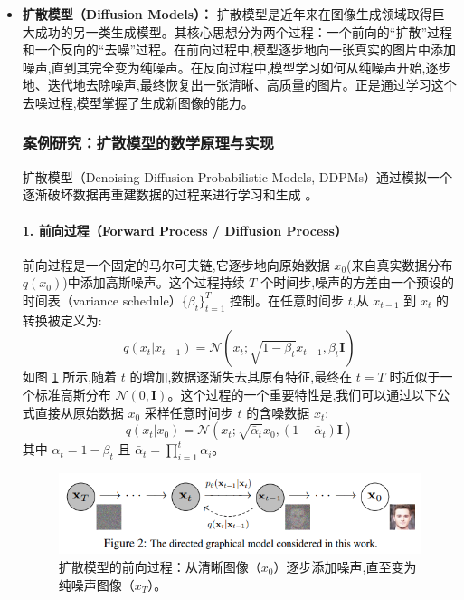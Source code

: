 \begin{itemize}
    \item \textbf{扩散模型（Diffusion Models）：} 扩散模型是近年来在图像生成领域取得巨大成功的另一类生成模型。其核心思想分为两个过程：一个前向的“扩散”过程和一个反向的“去噪”过程。在前向过程中,模型逐步地向一张真实的图片中添加噪声,直到其完全变为纯噪声。在反向过程中,模型学习如何从纯噪声开始,逐步地、迭代地去除噪声,最终恢复出一张清晰、高质量的图片。正是通过学习这个去噪过程,模型掌握了生成新图像的能力。

    \subsubsection*{案例研究：扩散模型的数学原理与实现}
    \label{sssec:diffusion_case_study}
    扩散模型（Denoising Diffusion Probabilistic Models, DDPMs）通过模拟一个逐渐破坏数据再重建数据的过程来进行学习和生成 \cite{croitoru2023diffusion}。

    \paragraph{1. 前向过程（Forward Process / Diffusion Process）}
    前向过程是一个固定的马尔可夫链,它逐步地向原始数据 $x_0$(来自真实数据分布 $q(x_0)$)中添加高斯噪声。这个过程持续 $T$ 个时间步,噪声的方差由一个预设的时间表（variance schedule）$\{\beta_t\}_{t=1}^T$ 控制。在任意时间步 $t$,从 $x_{t-1}$ 到 $x_t$ 的转换被定义为:
    $$ q(x_t | x_{t-1}) = \mathcal{N}(x_t; \sqrt{1 - \beta_t} x_{t-1}, \beta_t \mathbf{I}) $$
    如图 \ref{fig:diffusion_forward_process} 所示,随着 $t$ 的增加,数据逐渐失去其原有特征,最终在 $t=T$ 时近似于一个标准高斯分布 $\mathcal{N}(0, \mathbf{I})$。这个过程的一个重要特性是,我们可以通过以下公式直接从原始数据 $x_0$ 采样任意时间步 $t$ 的含噪数据 $x_t$:
    $$ q(x_t | x_0) = \mathcal{N}(x_t; \sqrt{\bar{\alpha}_t} x_0, (1 - \bar{\alpha}_t) \mathbf{I}) $$
    其中 $\alpha_t = 1 - \beta_t$ 且 $\bar{\alpha}_t = \prod_{i=1}^t \alpha_i$。

    \begin{figure}[H]
        \centering
        \includegraphics[width=\textwidth]{figures/D1.png}
        \caption{扩散模型的前向过程：从清晰图像（$x_0$）逐步添加噪声,直至变为纯噪声图像（$x_T$）。}
        \label{fig:diffusion_forward_process}
    \end{figure}


\end{itemize}
